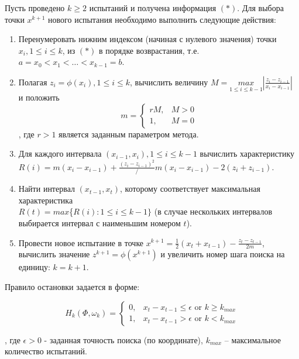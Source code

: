 \documentclass{report}
\begin{document}
Пусть проведено $k\geq 2$ испытаний и получена информация $(*)$. Для выбора точки $x^{k+1}$ нового испытания необходимо выполнить следующие действия:
\begin{enumerate} 
    \item Перенумеровать нижним индексом (начиная с нулевого значения) точки $x_i, 1\leq i\leq k$, из $(*)$ в порядке возврастания, т.е. $a=x_0 < x_1 < \dots < x_{k-1}=b$.
    \item  Полагая $z_i=\phi (x_i),1\leq i\leq k$, вычислить величину $M = \underset{1\leq i \leq k-1}{max}|\frac{z_i-z_{i-1}}{x_i-x_{i-1}}|$ и положить
    \begin{equation*}
        m = 
        \begin{cases}
            rM,    &\text{$M > 0$} \\
            1, &\text{$M = 0$}
        \end{cases}
    \end{equation*}
, где $r > 1$ является заданным параметром метода.
    \item Для каждого интервала $(x_{i-1},x_i ),1 \leq i\leq k-1$ вычислить характеристику \\$R(i)=m(x_i-x_{i-1} )+ \frac{(z_i-z_{i-1})^2}/{m(x_i-x_{i-1})}-2(z_i+z_{i-1})$.
    \item Найти интервал $(x_{t-1},x_t )$, которому соответствует максимальная характеристика\\ $R(t)=max$\{$R(i):  1\leq i\leq k-1\}$ (в случае нескольких интервалов выбирается интервал с наименьшим номером $t$).
    \item Провести новое испытание в точке $x^{k+1}=\frac{1}{2} (x_t+x_{t-1} )- \frac{z_t-z_{t-1}}{2m}$, вычислить значение $z^{k+1}=\phi (x^{k+1})$ и увеличить номер шага поиска на единицу: $k = k + 1$.
\end{enumerate}

Правило остановки задается в форме:

\begin{equation*}
    H_k(\Phi , \omega_k) = 
    \begin{cases}
        0,    &\text{$x_t - x_{t-1} \leq \epsilon$ or $k \geq k_{max}$}\\
        1, &\text{$x_t - x_{t-1} > \epsilon$ or $k < k_{max}$}
    \end{cases}
\end{equation*}

, где $\epsilon > 0$  - заданная точность поиска (по координате), $k_{max}$ – максимальное количество испытаний.
\end{document}
